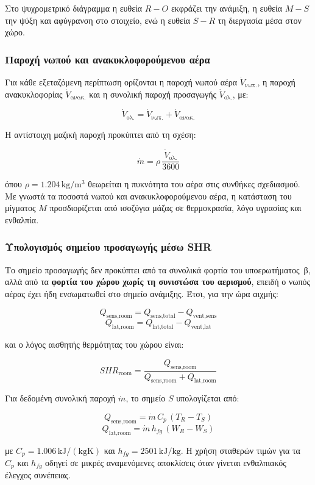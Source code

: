 \documentclass[12pt,a4paper]{article}
\begin{document}
Στο ψυχρομετρικό διάγραμμα η ευθεία \(R{-}O\) εκφράζει την ανάμιξη, η ευθεία
\(M{-}S\) την ψύξη και αφύγρανση στο στοιχείο, ενώ η ευθεία \(S{-}R\) τη διεργασία
μέσα στον χώρο.

\subsubsection{Παροχή νωπού και ανακυκλοφορούμενου αέρα}

Για κάθε εξεταζόμενη περίπτωση ορίζονται η παροχή νωπού αέρα
\(\dot V_{\text{νωπ.}}\), η παροχή ανακυκλοφορίας
\(\dot V_{\text{ανακ.}}\) και η συνολική παροχή προσαγωγής
\(\dot V_{\text{ολ.}}\), με:

\[
\dot V_{\text{ολ.}} = \dot V_{\text{νωπ.}} + \dot V_{\text{ανακ.}}
\]

Η αντίστοιχη μαζική παροχή προκύπτει από τη σχέση:

\[
\dot m = \rho \, \frac{\dot V_{\text{ολ.}}}{3600}
\]

όπου \(\rho = 1.204\,\mathrm{kg/m^3}\) θεωρείται η πυκνότητα του αέρα στις
συνθήκες σχεδιασμού. Με γνωστά τα ποσοστά νωπού και ανακυκλοφορούμενου αέρα,
η κατάσταση του μίγματος \(M\) προσδιορίζεται από ισοζύγια μάζας σε θερμοκρασία,
λόγο υγρασίας και ενθαλπία.

\subsubsection{Υπολογισμός σημείου προσαγωγής μέσω SHR}

Το σημείο προσαγωγής δεν προκύπτει από τα συνολικά φορτία του υποερωτήματος~β,
αλλά από τα \textbf{φορτία του χώρου χωρίς τη συνιστώσα του αερισμού}, επειδή ο
νωπός αέρας έχει ήδη ενσωματωθεί στο σημείο ανάμιξης. Έτσι, για την ώρα αιχμής:

\[
Q_{\text{sens,room}} = Q_{\text{sens,total}} - Q_{\text{vent,sens}}
\]
\[
Q_{\text{lat,room}} = Q_{\text{lat,total}} - Q_{\text{vent,lat}}
\]

και ο λόγος αισθητής θερμότητας του χώρου είναι:

\[
SHR_{\text{room}} =
\frac{Q_{\text{sens,room}}}
{Q_{\text{sens,room}} + Q_{\text{lat,room}}}
\]

Για δεδομένη συνολική παροχή \(\dot m\), το σημείο \(S\) υπολογίζεται από:

\[
Q_{\text{sens,room}} = \dot m \, C_p \, (T_R - T_S)
\]
\[
Q_{\text{lat,room}} = \dot m \, h_{fg} \, (W_R - W_S)
\]

με \(C_p = 1.006\,\mathrm{kJ/(kgK)}\) και
\(h_{fg} = 2501\,\mathrm{kJ/kg}\). Η χρήση σταθερών τιμών για τα \(C_p\) και
\(h_{fg}\) οδηγεί σε μικρές αναμενόμενες αποκλίσεις όταν γίνεται ενθαλπιακός
έλεγχος συνέπειας.
\end{document}
